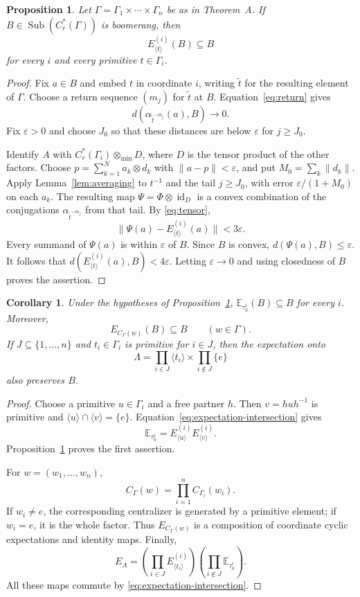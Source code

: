\documentclass[11pt,letterpaper]{amsart}
\numberwithin{equation}{section}
\newtheorem{proposition}[theorem]{Proposition}
\newtheorem{corollary}[theorem]{Corollary}
\theoremstyle{definition}
\theoremstyle{remark}
\newcommand{\Cr}{C_r^*}
\newcommand{\Sub}{\operatorname{Sub}}
\newcommand{\id}{\operatorname{id}}
\newcommand{\Ecyc}[2]{E_{\langle #2\rangle}^{(#1)}}
\newcommand{\Etrace}[1]{\mathbb E_{\tau_0^{#1}}}
\begin{document}
\begin{proposition}\label{prop:cyclic}
Let $\Gamma=\Gamma_1\times\cdots\times\Gamma_n$ be as in Theorem~A.
If $B\in\Sub(\Cr(\Gamma))$ is boomerang, then
\[
 \Ecyc{i}{t}(B)\subseteq B
\]
for every $i$ and every primitive $t\in\Gamma_i$.
\end{proposition}
\begin{proof}
Fix $a\in B$ and embed $t$ in coordinate $i$, writing $\widetilde t$
for the resulting element of $\Gamma$. Choose a return sequence
$(m_j)$ for $\widetilde t$ at $B$. Equation~\eqref{eq:return} gives
\[
 d(\alpha_{\widetilde t^{-m_j}}(a),B)\longrightarrow0.
\]
Fix $\varepsilon>0$ and choose $J_0$ so that these distances are below
$\varepsilon$ for $j\ge J_0$.

Identify $A$ with $\Cr(\Gamma_i)\otimes_{\min}D$, where $D$ is the
tensor product of the other factors. Choose
$p=\sum_{k=1}^{N}a_k\otimes d_k$ with $\|a-p\|<\varepsilon$, and put
$M_0=\sum_k\|d_k\|$.
Apply Lemma~\ref{lem:averaging} to $t^{-1}$ and the tail $j\ge J_0$,
with error $\varepsilon/(1+M_0)$ on each $a_k$.
The resulting map $\Psi=\Phi\otimes\id_D$ is a convex combination
of the conjugations $\alpha_{\widetilde t^{-m_j}}$ from that tail.
By \eqref{eq:tensor},
\[
 \|\Psi(a)-\Ecyc{i}{t}(a)\|<3\varepsilon.
\]
Every summand of $\Psi(a)$ is within $\varepsilon$ of $B$. Since $B$
is convex, $d(\Psi(a),B)\le\varepsilon$. It follows that
$d(\Ecyc{i}{t}(a),B)<4\varepsilon$.
Letting $\varepsilon\to0$ and using closedness of $B$ proves the assertion.
\end{proof}

\begin{corollary}\label{cor:expectations}
Under the hypotheses of Proposition~\ref{prop:cyclic},
$\Etrace{i}(B)\subseteq B$ for every $i$.
Moreover,
\[
 E_{C_\Gamma(w)}(B)\subseteq B\qquad(w\in\Gamma).
\]
If $J\subseteq\{1,\ldots,n\}$ and $t_i\in\Gamma_i$ is primitive
for $i\in J$, then the expectation onto
\[
 \Lambda=
 \prod_{i\in J}\langle t_i\rangle
 \times\prod_{i\notin J}\{e\}
\]
also preserves $B$.
\end{corollary}
\begin{proof}
Choose a primitive $u\in\Gamma_i$ and a free partner $h$.
Then $v=huh^{-1}$ is primitive and
$\langle u\rangle\cap\langle v\rangle=\{e\}$.
Equation~\eqref{eq:expectation-intersection} gives
\begin{equation}\label{eq:coordinate-trace}
 \Etrace{i}=\Ecyc{i}{u}\Ecyc{i}{v}.
\end{equation}
Proposition~\ref{prop:cyclic} proves the first assertion.

For $w=(w_1,\ldots,w_n)$,
\[
 C_\Gamma(w)=\prod_{i=1}^{n}C_{\Gamma_i}(w_i).
\]
If $w_i\ne e$, the corresponding centralizer is generated by a
primitive element; if $w_i=e$, it is the whole factor.
Thus $E_{C_\Gamma(w)}$ is a composition of coordinate cyclic
expectations and identity maps.
Finally,
\begin{equation}\label{eq:lambda-expectation}
 E_\Lambda
 =\left(\prod_{i\in J}\Ecyc{i}{t_i}\right)
  \left(\prod_{i\notin J}\Etrace{i}\right).
\end{equation}
All these maps commute by \eqref{eq:expectation-intersection}.
\end{proof}
\end{document}
